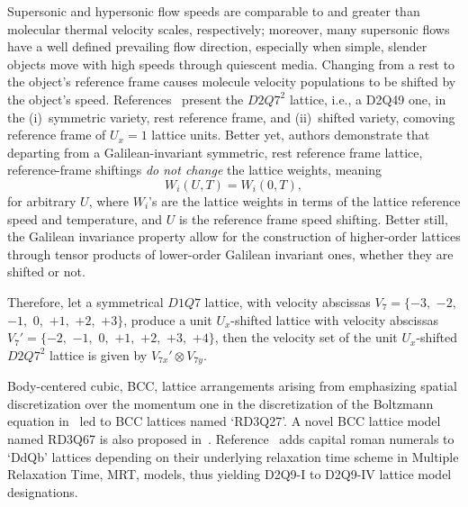     Supersonic and hypersonic flow speeds are comparable to and greater than molecular thermal  velocity  scales,  respectively;
    moreover, many supersonic flows have a well defined prevailing flow direction, especially when simple, slender objects  move
    with high speeds through quiescent media. Changing from a rest to the object's  reference  frame  causes  molecule  velocity
    populations   to   be    shifted    by    the    object's    speed.    References~\cite{2016-FrapolliN+KarlinIV-PhysRevLett,
    2020-FrapolliN+KarlinIV-Entropy} present the $D2Q7^2$ lattice, i.e.,  a  D2Q49  one,  in  the  (i)~symmetric  variety,  rest
    reference frame, and (ii)~shifted variety, comoving reference frame  of  $U_x  =  1$  lattice  units.  Better  yet,  authors
    demonstrate that departing from a Galilean-invariant symmetric, rest  reference  frame  lattice,  reference-frame  shiftings
    \emph{do not change} the lattice weights, meaning%
    \begin{equation}
        W_i(U, T) = W_i(0, T),
    \end{equation}
    \noindent for arbitrary $U$, where $W_i$'s are the lattice weights in terms of the lattice reference speed and  temperature,
    and $U$ is the reference frame speed shifting. Better still, the Galilean invariance property allow for the construction  of
    higher-order lattices through tensor products of lower-order Galilean invariant ones, whether they are shifted or not.

    Therefore, let a symmetrical $D1Q7$ lattice, with velocity abscissas $V_7 = \{-3,$ $-2,$  $-1,$  $0,$  $+1,$  $+2,$  $+3\}$,
    produce a unit $U_x$-shifted lattice with velocity abscissas $V_7' = \{-2,$ $-1,$ $0,$ $+1,$ $+2,$ $+3,$  $+4\}$,  then  the
    velocity set of the unit $U_x$-shifted $D2Q7^2$ lattice is given by $V_{7x}' \otimes V_{7y}$.

    Body-centered cubic, BCC, lattice arrangements arising from emphasizing spatial discretization over the momentum one in  the
    discretization of the Boltzmann equation in~\cite{2016-NamburiM+AnsumaliS-SciRep} led to  BCC  lattices  named  `RD3Q27'.  A
    novel    BCC    lattice    model    named    RD3Q67    is     also     proposed     in~\cite{2018-AtifM+AnsumaliS-PhysRevE}.
    Reference~\cite{2017-LiL+KlausnerJF-IntJHeatMassTran} adds capital roman numerals to  `DdQb'  lattices  depending  on  their
    underlying relaxation time scheme in Multiple Relaxation Time, MRT, models, thus yielding D2Q9-I to  D2Q9-IV  lattice  model
    designations.

